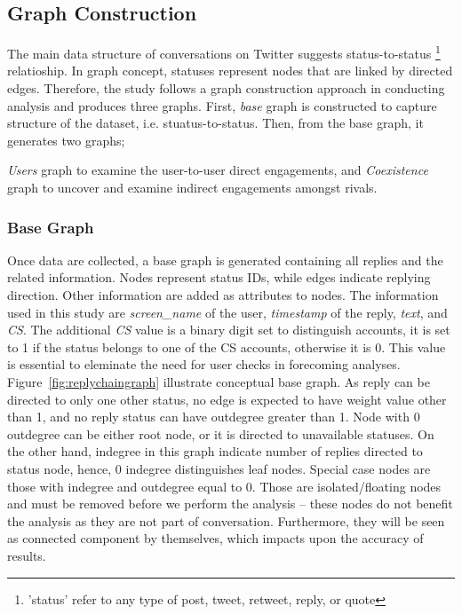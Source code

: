 \documentclass[sigconf]{acmart}
\begin{document}
\subsection{Graph Construction}\label{graphconstruction}
The main data structure of conversations on Twitter suggests status-to-status
{\footnote{'status' refer to any type of post, tweet, retweet, reply, or quote}} 
relatioship. In graph concept, statuses represent nodes that are linked by 
directed edges. Therefore, the study follows a graph construction approach 
in conducting analysis and produces three graphs. First, {\emph{base}} 
graph is constructed to capture structure of the dataset, i.e. stuatus-to-status. 
Then, from the base graph, it generates two graphs; {\emph{Users} 
graph to examine the user-to-user direct engagements, and {\emph{Coexistence}} 
graph to uncover and examine indirect engagements amongst rivals. 

\subsubsection{Base Graph}

Once data are collected, a base graph is generated 
containing all replies and the related information. Nodes represent status IDs, 
while edges indicate replying direction. Other information  
are added as attributes to nodes. The information used in this study 
are {\emph{screen\_name}} of the user, {\emph{timestamp}} of the 
reply, {\emph{text}}, and {\emph{CS}}. The additional {\emph{CS}} 
value is a binary digit set to distinguish accounts, it is set to 1 if the status belongs to 
one of the CS accounts, otherwise it is 0. This value is essential to eleminate the need 
for user checks in forecoming analyses. Figure~\ref{fig:replychaingraph} 
illustrate conceptual base graph. As reply can be directed to only one 
other status, no edge is expected to have weight value other than 1, and no reply
status can have outdegree greater than 1. Node with 0 outdegree can be either
root node, or it is directed to unavailable statuses. On the other hand, indegree in 
this graph indicate number of replies directed to status node, hence, 0 indegree 
distinguishes leaf nodes. Special case nodes are those with indegree and outdegree equal
to 0. Those are isolated/floating nodes and must be removed before we
perform the analysis -- these nodes do not benefit the analysis as
they are not part of conversation. Furthermore, they will be seen
as connected component by themselves, which impacts upon the accuracy
of results.

}
\end{document}
